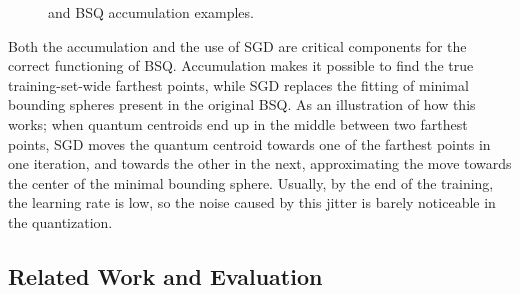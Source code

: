 			\begin{figure}[ht]
				\centering
				\hspace{0.1\textwidth}
				\caption[Neural-net-based \kmeans{} and BSQ accumulation]{\kmeans{} and BSQ accumulation examples.}
				\label{fig:accumulate}
			\end{figure}
			
			Both the accumulation and the use of \ac{SGD} are critical components for the correct functioning of \ac{BSQ}.
			Accumulation makes it possible to find the true training-set-wide farthest points, while \ac{SGD} replaces the fitting of minimal bounding spheres present in the original \ac{BSQ}.
			As an illustration of how this works; when quantum centroids end up in the middle between two farthest points, \ac{SGD} moves the quantum centroid towards one of the farthest points in one iteration, and towards the other in the next, approximating the move towards the center of the minimal bounding sphere.
			Usually, by the end of the training, the learning rate is low, so the noise caused by this jitter is barely noticeable in the quantization.
			
		\subsection{Related Work and Evaluation}
			

